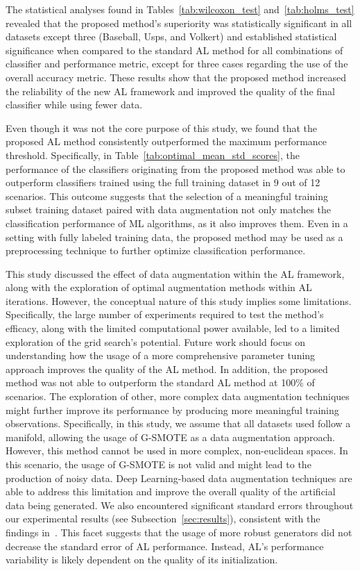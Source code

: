 \documentclass[10pt,journal,compsoc]{IEEEtran}
\begin{document}
The statistical analyses found in Tables~\ref{tab:wilcoxon_test}
and~\ref{tab:holms_test} revealed that the proposed method's superiority was
statistically significant in all datasets except three (Baseball, Usps, and
Volkert) and established statistical significance when compared to the
standard AL method for all combinations of classifier and performance metric,
except for three cases regarding the use of the overall accuracy metric. These
results show that the proposed method increased the reliability of the new AL
framework and improved the quality of the final classifier while using fewer
data.

Even though it was not the core purpose of this study, we found that the
proposed AL method consistently outperformed the maximum performance
threshold. Specifically, in Table~\ref{tab:optimal_mean_std_scores}, the
performance of the classifiers originating from the proposed method was able
to outperform classifiers trained using the full training dataset in 9 out of
12 scenarios. This outcome suggests that the selection of a meaningful
training subset training dataset paired with data augmentation not only
matches the classification performance of ML algorithms, as it also improves
them. Even in a setting with fully labeled training data, the proposed method
may be used as a preprocessing technique to further optimize classification
performance.

This study discussed the effect of data augmentation within the AL framework,
along with the exploration of optimal augmentation methods within AL
iterations. However, the conceptual nature of this study implies some
limitations. Specifically, the large number of experiments required to
test the method's efficacy, along with the limited computational power
available, led to a limited exploration of the grid search's potential. Future
work should focus on understanding how the usage of a more comprehensive
parameter tuning approach improves the quality of the AL method. In addition,
the proposed method was not able to outperform the standard AL method at
100\% of scenarios. The exploration of other, more complex data augmentation
techniques might further improve its performance by producing more
meaningful training observations. Specifically, in this study, we assume
that all datasets used follow a manifold, allowing the usage of G-SMOTE as a
data augmentation approach. However, this method cannot be used in more
complex, non-euclidean spaces. In this scenario, the usage of G-SMOTE is not
valid and might lead to the production of noisy data. Deep Learning-based data
augmentation techniques are able to address this limitation and improve the
overall quality of the artificial data being generated. We also
encountered significant standard errors throughout our experimental
results (see Subsection~\ref{sec:results}), consistent with the findings
in~\cite{Fonseca2021, Kottke2017}. This facet suggests that the usage of
more robust generators did not decrease the standard error of AL performance.
Instead, AL's performance variability is likely dependent on the quality of
its initialization.
\end{document}
